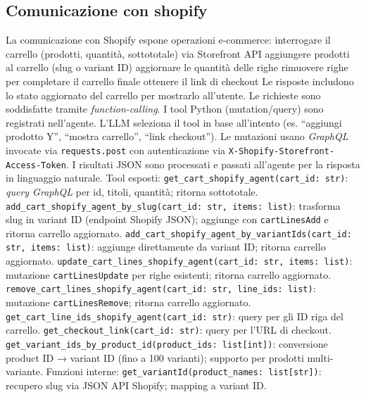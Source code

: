 \subsection{Comunicazione con shopify}
La comunicazione con Shopify espone operazioni e-commerce:
interrogare il carrello (prodotti, quantità, sottototale) via Storefront API
aggiungere prodotti al carrello (slug o variant ID)
aggiornare le quantità delle righe
rimuovere righe per completare il carrello finale
ottenere il link di checkout
Le risposte includono lo stato aggiornato del carrello per mostrarlo all’utente.
Le richieste sono soddisfatte tramite \emph{function-calling}. I tool Python (mutation/query) sono registrati nell’agente. 
L’LLM seleziona il tool in base all’intento (es. “aggiungi prodotto Y”, “mostra carrello”, “link checkout”). 
Le mutazioni usano \emph{GraphQL} invocate via \texttt{requests.post} con autenticazione via \texttt{X-Shopify-Storefront-Access-Token}. 
I risultati JSON sono processati e passati all’agente per la risposta in linguaggio naturale.
Tool esposti:
\verb|get_cart_shopify_agent(cart_id: str)|: \emph{query GraphQL} per id, titoli, quantità; ritorna sottototale.
\verb|add_cart_shopify_agent_by_slug(cart_id: str, items: list)|: trasforma slug in variant ID (endpoint Shopify JSON); aggiunge con \texttt{cartLinesAdd} e ritorna carrello aggiornato.
\verb|add_cart_shopify_agent_by_variantIds(cart_id: str, items: list)|: aggiunge direttamente da variant ID; ritorna carrello aggiornato.
\verb|update_cart_lines_shopify_agent(cart_id: str, items: list)|: mutazione \texttt{cartLinesUpdate} per righe esistenti; ritorna carrello aggiornato.
\verb|remove_cart_lines_shopify_agent(cart_id: str, line_ids: list)|: mutazione \texttt{cartLinesRemove}; ritorna carrello aggiornato.
\verb|get_cart_line_ids_shopify_agent(cart_id: str)|: query per gli ID riga del carrello.
\verb|get_checkout_link(cart_id: str)|: query per l’URL di checkout.
\verb|get_variant_ids_by_product_id(product_ids: list[int])|: conversione product ID → variant ID (fino a 100 varianti); supporto per prodotti multi-variante.
Funzioni interne:
\verb|get_variantId(product_names: list[str])|: recupero slug via JSON API Shopify; mapping a variant ID.
